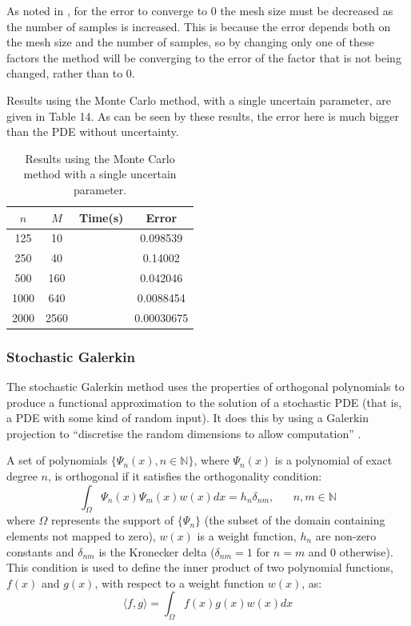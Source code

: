 \documentclass{article}
\numberwithin{equation}{section}
\begin{document}
As noted in \cite{Bishop}, for the error to converge to 0 the mesh size must be decreased as the number of samples is increased. This is because the error depends both on the mesh size and the number of samples, so by changing only one of these factors the method will be converging to the error of the factor that is not being changed, rather than to 0. 

Results using the Monte Carlo method, with a single uncertain parameter, are given in Table 14. As can be seen by these results, the error here is much bigger than the PDE without uncertainty. 
\begin{table}[H]
\centering
\begin{tabular}{|c|c|c|c|}
\hline
$n$ & $M$ & Time(s) & Error \\
\hline
125 & 10 & & 0.098539 \\
250 & 40 & & 0.14002 \\
500 & 160 & & 0.042046 \\
1000 & 640 & & 0.0088454 \\
2000 & 2560 & & 0.00030675 \\
\hline
\end{tabular}
\captionsetup{justification=centering}
\caption{Results using the Monte Carlo method with a single uncertain parameter.}
\end{table}


\subsubsection{Stochastic Galerkin}
The stochastic Galerkin method uses the properties of orthogonal polynomials to produce a functional approximation to the solution of a stochastic PDE (that is, a PDE with some kind of random input). It does this by using a Galerkin projection to ``discretise the random dimensions to allow computation'' \cite{Paul}. 

A set of polynomials $\{\Psi_n(x), n \in \mathbb{N}\}$, where $\Psi_n(x)$ is a polynomial of exact degree $n$, is orthogonal if it satisfies the orthogonality condition:
\begin{equation}
\int_{\Omega} \Psi_n(x) \Psi_m(x) w(x) dx = h_n \delta_{nm}, \;\;\;\;\;\; n,m \in \mathbb{N}
\end{equation} 
where $\Omega$ represents the support of $\{\Psi_n\}$ (the subset of the domain containing elements not mapped to zero), $w(x)$ is a weight function, $h_n$ are non-zero constants and $\delta_{nm}$ is the Kronecker delta ($\delta_{nm} = 1$ for $n=m$ and $0$ otherwise). This condition is used to define the inner product of two polynomial functions, $f(x)$ and $g(x)$, with respect to a weight function $w(x)$, as:
\begin{equation}
\langle f, g \rangle = \int_{\Omega} f(x)g(x)w(x) dx
\end{equation}
\end{document}
